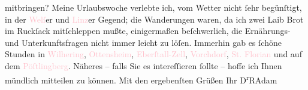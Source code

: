                     mitbringen?\pend
           \pstart
           Meine Urlaubswoche verlebte ich, vom Wetter nicht ſehr begünſtigt, in der \textcolor{pink}{Welſ}{}\ledrightnote{\textcolor{pink}{Wels}}er und \textcolor{pink}{Linz}{}\ledrightnote{\textcolor{pink}{Linz}}er Gegend; die Wanderungen waren, da ich zwei Laib Brot im
                    Ruckſack mitſchleppen mußte, einigermaßen beſchwerlich, die Ernährungs- und
                    Unterkunftsfragen nicht immer leicht zu löſen. Immerhin gab es ſchöne Stunden in
                        \textcolor{pink}{Wilhering}{}\ledrightnote{\textcolor{pink}{Wilhering}}, \textcolor{pink}{Ottensheim}{}\ledrightnote{\textcolor{pink}{Ottensheim}}, \textcolor{pink}{Eberſtall-Zell}{}\ledrightnote{\textcolor{pink}{Eberstalzell}}, \textcolor{pink}{Vorchdorf}{}\ledrightnote{\textcolor{pink}{Vorchdorf}}, \textcolor{pink}{St.
                        Florian}{}\ledrightnote{\textcolor{pink}{Sankt Florian}} und auf dem \textcolor{pink}{Pöſtlingberg}{}\ledrightnote{\textcolor{pink}{Pöstlingberg}}.
                    Näheres – falls Sie es intereſſieren ſollte – hoffe ich Ihnen münd{\pb}lich mitteilen zu können.\pend
           \pstart
           Mit den ergebenſten Grüßen Ihr\pend
           \pstart \spacefill\mbox{D\textsuperscript{r}RAdam}\pend{}\endnumbering{}  
      